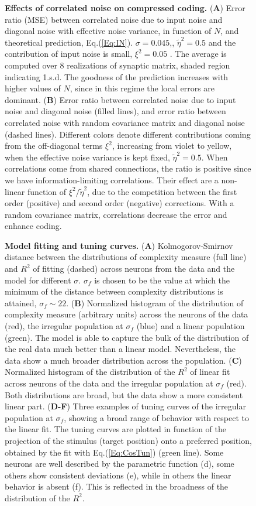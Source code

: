 \documentclass[a4paper]{article}%
\begin{document}
\begin{figure}[ptb]
\centering
{}\caption{\textbf{Effects of
correlated noise on compressed coding.} (\textbf{A}) Error ratio (MSE) between
correlated noise due to input noise and diagonal noise with effective noise
variance, in function of $N$, and theoretical prediction, Eq.(\ref{Eq:IN}).
$\sigma=0.045$,, $\tilde\eta^{2} = 0.5$ and the contribution of
input noise is small, $\xi^{2} = 0.05$ . The average is computed over 8 realizations of synaptic matrix, shaded region indicating
1.s.d. The goodness of the prediction increases with higher values of $N$,
since in this regime the local errors are dominant. (\textbf{B}) Error ratio
between correlated noise due to input noise and diagonal noise (filled lines),
and error ratio between correlated noise with random covariance matrix and
diagonal noise (dashed lines). Different colors denote different contributions
coming from the off-diagonal terms $\xi^{2}$, increasing from violet to
yellow, when the effective noise variance is kept fixed, $\tilde\eta^{2} =
0.5$. When correlations come from shared connections, the ratio is positive
since we have information-limiting correlations. Their effect are a non-linear
function of $\xi^{2}/\tilde\eta^{2}$, due to the competition between
the first order (positive) and second order (negative) corrections. With a
random covariance matrix, correlations decrease the error and enhance coding.}
\label{Fig:7}
\end{figure}\clearpage
\begin{figure}[ptb]
\centering
{}\caption{ \textbf{Model
fitting and tuning curves.} (\textbf{A}) Kolmogorov-Smirnov distance between
the distributions of complexity measure (full line) and $R^{2}$ of fitting
(dashed) across neurons from the data and the model for different $\sigma$.
$\sigma_{f}$ is chosen to be the value at which the minimum of the distance
between complexity distributions is attained, $\sigma_{f}\sim22$. (\textbf{B})
Normalized histogram of the distribution of complexity measure (arbitrary
units) across the neurons of the data (red), the irregular population at
$\sigma_{f}$ (blue) and a linear population (green). The model is able to
capture the bulk of the distribution of the real data much better than a
linear model. Nevertheless, the data show a much broader distribution across
the population. (\textbf{C}) Normalized histogram of the distribution of the
$R^{2}$ of linear fit across neurons of the data and the irregular population
at $\sigma_{f}$ (red). Both distributions are broad, but the data show a more
consistent linear part. (\textbf{D-F}) Three examples of tuning curves of the
irregular population at $\sigma_{f}$, showing a broad range of behavior with
respect to the linear fit. The tuning curves are plotted in function of the
projection of the stimulus (target position) onto a preferred position,
obtained by the fit with Eq.(\ref{Eq:CosTun}) (green line). Some neurons are
well described by the parametric function (d), some others show consistent
deviations (e), while in others the linear behavior is absent (f). This is
reflected in the broadness of the distribution of the $R^{2}$. }
\label{Fig:8}
\end{figure}
\end{document}
